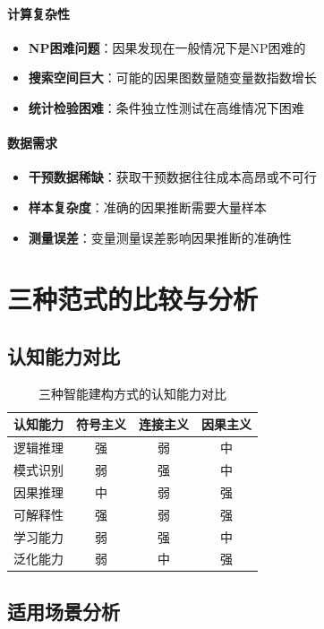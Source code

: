 \paragraph{计算复杂性}
\begin{itemize}
\item \textbf{NP困难问题}：因果发现在一般情况下是NP困难的
\item \textbf{搜索空间巨大}：可能的因果图数量随变量数指数增长
\item \textbf{统计检验困难}：条件独立性测试在高维情况下困难
\end{itemize}

\paragraph{数据需求}
\begin{itemize}
\item \textbf{干预数据稀缺}：获取干预数据往往成本高昂或不可行
\item \textbf{样本复杂度}：准确的因果推断需要大量样本
\item \textbf{测量误差}：变量测量误差影响因果推断的准确性
\end{itemize}

\section{三种范式的比较与分析}

\subsection{认知能力对比}

\begin{table}[h]
\centering
\caption{三种智能建构方式的认知能力对比}
\begin{tabular}{|l|c|c|c|}
\hline
\textbf{认知能力} & \textbf{符号主义} & \textbf{连接主义} & \textbf{因果主义} \\
\hline
逻辑推理 & 强 & 弱 & 中 \\
模式识别 & 弱 & 强 & 中 \\
因果推理 & 中 & 弱 & 强 \\
可解释性 & 强 & 弱 & 强 \\
学习能力 & 弱 & 强 & 中 \\
泛化能力 & 弱 & 中 & 强 \\
\hline
\end{tabular}
\end{table}

\subsection{适用场景分析}

